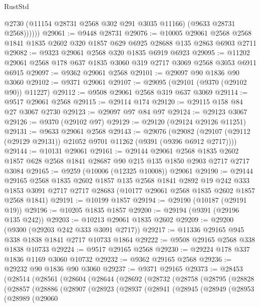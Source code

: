 \begin{lexlean}{RustStd}
\begin{coremodule}
              @2730
              (@11154 @28731 @2568 @302 @291 @3035 @11166)
              (@9633 @28731 @2568))))))
@29061 := @9448 @28731
@29076 := @10005
    @29061
    @2568
    @2568
    @1841
    @1835
    @2602
    @320
    @1857
    @629
    @6925
    @28688
    @135
    @2863
    @6903
    @2711
@29082 := @9323 @29061 @2568 @320 @1835 @6919 @6923
@29095 := @11202 @29061 @2568 @178 @637 @1835 @3060 @319 @2717 @3069 @2568 @3053 @6911 @6915
@29097 := @9362 @29061 @2568
@29101 := @29097 @90 @1836 @90 @3060
@29102 := @9371 @29061
@29107 := @29095 (@29101 (@9370 (@29102 @90)) @11227)
@29112 := @9508 @29061 @2568 @319 @637 @3069
@29114 := @9517 @29061 @2568
@29115 := @29114 @174
@29120 := @29115 @158 @84 @27 @3067 @2730
@29123 := @29097 @97 @84 @97
@29124 := @29123 @3067
@29126 := @9370 (@29102 @97)
@29129 := @29120 (@29124 @29126 @11251)
@29131 := @9633 @29061 @2568
@29143 := @29076
    (@29082 (@29107 (@29112 (@29129 @29131)) @21052 @9701 @11262 (@9391 (@9396 @6912 @2717))))
@29144 := @10131 @29061
@29161 := @29144
    @29061
    @2568
    @1835
    @2602
    @1857
    @628
    @2568
    @1841
    @28687
    @90
    @215
    @135
    @1850
    @2903
    @2717
    @2717
    @3084
@29165 := @9259 (@10006 (@12325 @10008)) @29061
@29190 := @29144
    @29165
    @2568
    @1835
    @2602
    @1857
    @135
    @2568
    @1841
    @2892
    @19
    @242
    @333
    @1853
    @3091
    @2717
    @2717
    @28683
    (@10177 @29061 @2568 @1835 @2602 @1857 @2568 @1841)
@29191 := @10199 @1857
@29194 := @29190 (@10187 (@29191 @19))
@29196 := @10205 @1835 @1857
@29200 := @29194 (@9391 (@29196 @135 @242))
@29203 := @10213 @29061 @1835 @2602
@29209 := @29200 (@9300 (@29203 @242 @333 @3091 @2717))
@29217 := @11336 @29165 @945 @338 @1838 @1841 @2717 @10733 @1864
@29222 := @9508 @29165 @2568 @338 @1838 @10733
@29224 := @9517 @29165 @2568
@29230 := @29224 @178 @337 @1836 @1169 @3060 @10732
@29232 := @9362 @29165 @2568
@29236 := @29232 @90 @1836 @90 @3060
@29237 := @9371 @29165
@29373 := @28453
    (@28514
      (@28561
        (@28604
          (@28644
            (@28692
              (@28732
                (@28758
                  (@28795
                    (@28828
                      (@28857
                        (@28886
                          (@28907
                            (@28923
                              (@28937
                                (@28941
                                  (@28945
                                    (@28949
                                      (@28953
                                        (@28989
                                          (@29060

\end{coremodule}
\end{lexlean}
